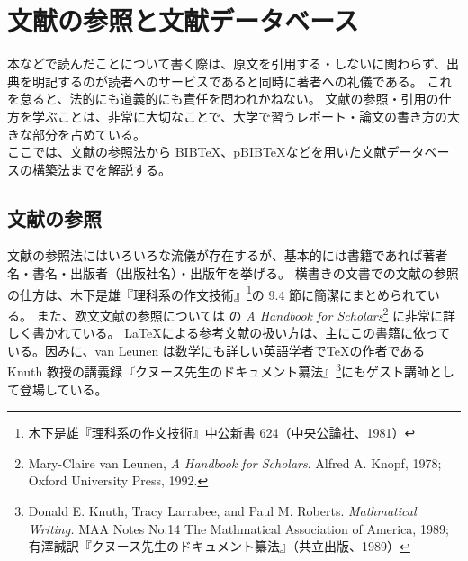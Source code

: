 \chapter{文献の参照と文献データベース}
本などで読んだことについて書く際は、原文を引用する・しないに関わらず、出典を明記するのが読者へのサービスであると同時に著者への礼儀である。
これを怠ると、法的にも道義的にも責任を問われかねない。
文献の参照・引用の仕方を学ぶことは、非常に大切なことで、大学で習うレポート・論文の書き方の大きな部分を占めている。\\

ここでは、文献の参照法から B{\scriptsize IB}\hspc{-1.50pt}\TeX{}、pB{\scriptsize IB}\hspc{-1.50pt}\TeX{}などを用いた文献データベースの構築法までを解説する。
\section{文献の参照}
文献の参照法にはいろいろな流儀が存在するが、基本的には書籍であれば著者名・書名・出版者（出版社名）・出版年を挙げる。
横書きの文書での文献の参照の仕方は、木下是雄『理科系の作文技術』\footnote{木下是雄『理科系の作文技術』中公新書 624（中央公論社、1981）}の 9.4 節に簡潔にまとめられている。
また、欧文文献の参照については   の \emph{A Handbook for Scholars}\footnote{Mary-Claire van Leunen, \emph{A Handbook for Scholars}. Alfred A. Knopf, 1978; Oxford University Press, 1992.} に非常に詳しく書かれている。
\LaTeX{}による参考文献の扱い方は、主にこの書籍に依っている。因みに、van Leunen は数学にも詳しい英語学者で\TeX{}の作者である Knuth 教授の講義録『クヌース先生のドキュメント纂法』\footnote{Donald E. Knuth, Tracy Larrabee, and Paul M. Roberts. \emph{Mathmatical Writing.} MAA Notes No.14 The Mathmatical Association of America, 1989; 有澤誠訳『クヌース先生のドキュメント纂法』（共立出版、1989）}にもゲスト講師として登場している。\\

